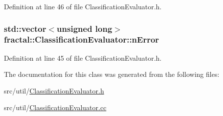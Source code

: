 Definition at line 46 of file Classification\+Evaluator.\+h.

\hypertarget{classfractal_1_1ClassificationEvaluator_a3881e87f040fa426adb3f6e26d167b8b}{
\subsubsection[{n\+Error}]{\setlength{\rightskip}{0pt plus 5cm}std\+::vector$<$unsigned long$>$ fractal\+::\+Classification\+Evaluator\+::n\+Error\hspace{0.3cm}{\ttfamily [protected]}}}\label{classfractal_1_1ClassificationEvaluator_a3881e87f040fa426adb3f6e26d167b8b}


Definition at line 45 of file Classification\+Evaluator.\+h.



The documentation for this class was generated from the following files\+:\begin{DoxyCompactItemize}
\item 
src/util/\hyperlink{ClassificationEvaluator_8h}{Classification\+Evaluator.\+h}\item 
src/util/\hyperlink{ClassificationEvaluator_8cc}{Classification\+Evaluator.\+cc}\end{DoxyCompactItemize}
